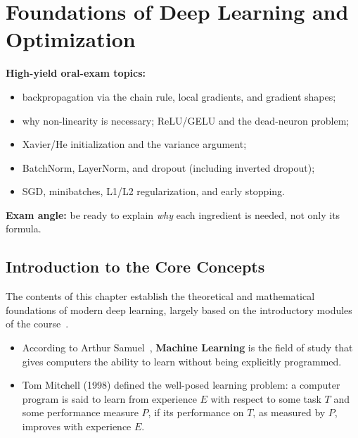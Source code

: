 \newpage

\chapter{Foundations of Deep Learning and Optimization}\label{ch:foundations}

\begin{ExamFocusBox}
\textbf{High-yield oral-exam topics:}
\begin{itemize}[nosep, leftmargin=*]
    \item backpropagation via the chain rule, local gradients, and gradient shapes;
    \item why non-linearity is necessary; ReLU/GELU and the dead-neuron problem;
    \item Xavier/He initialization and the variance argument;
    \item BatchNorm, LayerNorm, and dropout (including inverted dropout);
    \item SGD, minibatches, L1/L2 regularization, and early stopping.
\end{itemize}
\textbf{Exam angle:} be ready to explain \emph{why} each ingredient is needed, not only its formula.
\end{ExamFocusBox}


\section{Introduction to the Core Concepts}

The contents of this chapter establish the theoretical and mathematical foundations of modern deep learning, largely based on the introductory modules of the course~\cite{galasso2025nn,galasso2025training}.

\begin{keywordbox}
\begin{itemize}[nosep, leftmargin=*]
\item According to Arthur Samuel~\cite{samuel1959some}, \textbf{Machine Learning} is the field of study that gives computers the ability to learn without being explicitly programmed. 

\item Tom Mitchell (1998) defined the well-posed learning problem: a computer program is said to learn from experience $E$ with respect to some task $T$ and some performance measure $P$, if its performance on $T$, as measured by $P$, improves with experience $E$.
\end{itemize}
\end{keywordbox}

